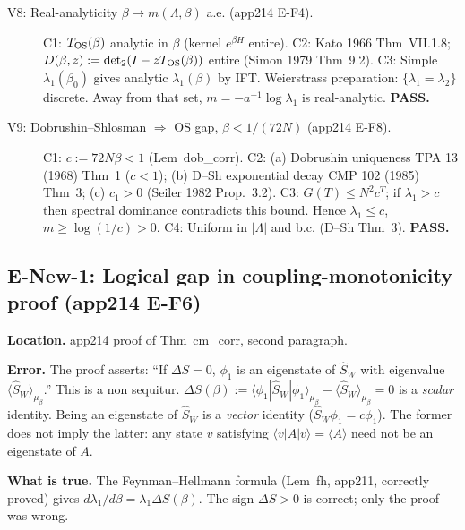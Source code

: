 \begin{description}
\item[V8: Real-analyticity $\beta\mapsto m(\Lambda,\beta)$ a.e. (app214 E-F4).]
C1: $T_{\rm OS}(\beta)$ analytic in $\beta$ (kernel $e^{\beta H}$ entire).
C2: Kato 1966 Thm~VII.1.8; $D(\beta,z):=\det_2(I-zT_{\rm OS}(\beta))$ entire (Simon 1979 Thm~9.2).
C3: Simple $\lambda_1(\beta_0)$ gives analytic $\lambda_1(\beta)$ by IFT.
Weierstrass preparation: $\{\lambda_1=\lambda_2\}$ discrete.
Away from that set, $m=-a^{-1}\log\lambda_1$ is real-analytic. \textbf{PASS.}

\item[V9: Dobrushin--Shlosman $\Rightarrow$ OS gap, $\beta<1/(72N)$ (app214 E-F8).]
C1: $c:=72N\beta<1$ (Lem~dob\_corr).
C2: (a) Dobrushin uniqueness TPA 13 (1968) Thm~1 ($c<1$);
(b) D--Sh exponential decay CMP 102 (1985) Thm~3; (c) $c_1>0$ (Seiler 1982 Prop.~3.2).
C3: $G(T)\le N^2 c^T$; if $\lambda_1>c$ then spectral dominance contradicts this bound.
Hence $\lambda_1\le c$, $m\ge\log(1/c)>0$.
C4: Uniform in $|\Lambda|$ and b.c. (D--Sh Thm~3). \textbf{PASS.}

\end{description}

\subsection{E-New-1: Logical gap in coupling-monotonicity proof (app214 E-F6)}
\label{ssec:enew1}

\textbf{Location.} app214 proof of Thm~cm\_corr, second paragraph.

\textbf{Error.} The proof asserts: ``If $\Delta S=0$, $\phi_1$ is an eigenstate
of $\hat{S}_W$ with eigenvalue $\langle\hat{S}_W\rangle_{\mu_\beta}$.'' This is a non sequitur.
$\Delta S(\beta):=\langle\phi_1|\hat{S}_W|\phi_1\rangle_{\mu_\beta}
-\langle\hat{S}_W\rangle_{\mu_\beta}=0$ is a \emph{scalar} identity.
Being an eigenstate of $\hat{S}_W$ is a \emph{vector} identity ($\hat{S}_W\phi_1=c\phi_1$).
The former does not imply the latter: any state $v$ satisfying
$\langle v|A|v\rangle=\langle A\rangle$ need not be an eigenstate of $A$.

\textbf{What is true.} The Feynman--Hellmann formula (Lem~fh, app211, correctly proved) gives
$d\lambda_1/d\beta=\lambda_1\Delta S(\beta)$.
The sign $\Delta S>0$ is correct; only the proof was wrong.

